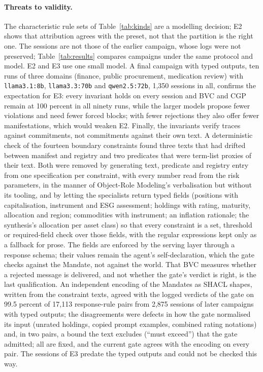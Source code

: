 \documentclass[runningheads]{llncs}
\begin{document}
\paragraph{Threats to validity.}
The characteristic rule sets of Table~\ref{tab:kinds} are a modelling decision; E2 shows that attribution agrees with the preset, not that the partition is the right one. The sessions are not those of the earlier campaign, whose logs were not preserved; Table~\ref{tab:results} compares campaigns under the same protocol and model. E2 and E3 use one small model. A final campaign with typed outputs, ten runs of three domains (finance, public procurement, medication review) with \texttt{llama3.1:8b}, \texttt{llama3.3:70b} and \texttt{qwen2.5:72b}, 1{,}350 sessions in all, confirms the expectation for E3: every invariant holds on every session and BVC and CGP remain at 100 percent in all ninety runs, while the larger models propose fewer violations and need fewer forced blocks; with fewer rejections they also offer fewer manifestations, which would weaken E2. Finally, the invariants verify traces against commitments, not commitments against their own text. A deterministic check of the fourteen boundary constraints found three texts that had drifted between manifest and registry and two predicates that were term-list proxies of their text. Both were removed by generating text, predicate and registry entry from one specification per constraint, with every number read from the risk parameters, in the manner of Object-Role Modeling's verbalisation but without its tooling, and by letting the specialists return typed fields (positions with capitalisation, instrument and ESG assessment; holdings with rating, maturity, allocation and region; commodities with instrument; an inflation rationale; the synthesis's allocation per asset class) so that every constraint is a set, threshold or required-field check over those fields, with the regular expressions kept only as a fallback for prose. The fields are enforced by the serving layer through a response schema; their values remain the agent's self-declaration, which the gate checks against the Mandate, not against the world. That BVC measures whether a rejected message is delivered, and not whether the gate's verdict is right, is the last qualification. An independent encoding of the Mandates as SHACL shapes, written from the constraint texts, agreed with the logged verdicts of the gate on 99.5 percent of 17{,}113 response-rule pairs from 2{,}875 sessions of later campaigns with typed outputs; the disagreements were defects in how the gate normalised its input (unrated holdings, copied prompt examples, combined rating notations) and, in two pairs, a bound the text excludes (``must exceed'') that the gate admitted; all are fixed, and the current gate agrees with the encoding on every pair. The sessions of E3 predate the typed outputs and could not be checked this way.
\end{document}
